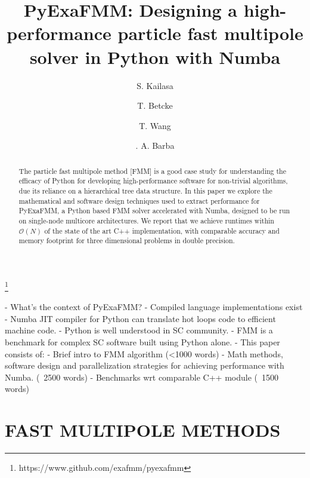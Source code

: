 \documentclass{IEEEcsmag}
\begin{document}

\title{PyExaFMM: Designing a high-performance particle fast multipole solver in Python with Numba}

\author{S. Kailasa}

\author{T. Betcke}

\author{T. Wang}

\author{. A. Barba}


\begin{abstract}
The particle fast multipole method [FMM] is a good case study for understanding the efficacy of Python for developing high-performance software for non-trivial algorithms, due its reliance on a hierarchical tree data structure. In this paper we explore the mathematical and software design techniques used to extract performance for PyExaFMM, a Python based FMM solver accelerated with Numba, designed to be run on single-node multicore architectures. We report that we achieve runtimes within $\mathcal{O}(N)$ of the state of the art C++ implementation, with comparable accuracy and memory footprint for three dimensional problems in double precision.
\end{abstract}

\maketitle
{}\footnote{https://www.github.com/exafmm/pyexafmm}

- What's the context of PyExaFMM?
	- Compiled language implementations exist
	- Numba JIT compiler for Python can translate hot loops code to efficient machine code.
	- Python is well understood in SC community.
	- FMM is a benchmark for complex SC software built using Python alone.
- This paper consists of:
	- Brief intro to FMM algorithm (<1000 words)
	- Math methods, software design and parallelization strategies for achieving performance with Numba. (~2500 words)
	- Benchmarks wrt comparable C++ module (~1500 words)

\section{FAST MULTIPOLE METHODS}
\end{document}
